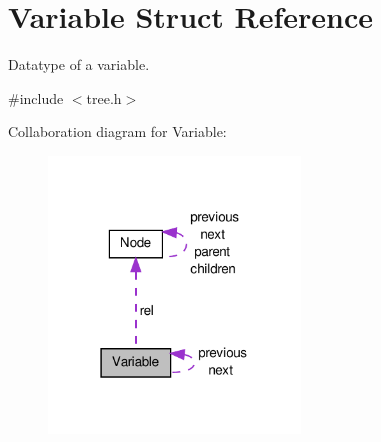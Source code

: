 \hypertarget{structVariable}{\section{Variable Struct Reference}
\label{structVariable}
}


Datatype of a variable.  




{\ttfamily \#include $<$tree.\-h$>$}



Collaboration diagram for Variable\-:\nopagebreak
\begin{figure}[H]
\begin{center}
\leavevmode
\includegraphics[width=190pt]{structVariable__coll__graph}
\end{center}
\end{figure}

